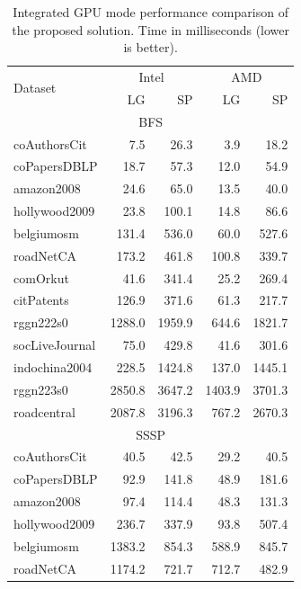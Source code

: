 \begin{table}[tbp]
\caption{Integrated GPU mode performance comparison of the proposed solution. Time in milliseconds (lower is better).} 
\begin{center}
    \begin{tabular}{|l|r|r|r|r|}
    \hline
    \multirow{2}{*}{Dataset} & \multicolumn{2}{c|}{Intel} & \multicolumn{2}{c|}{AMD} \\
    \cline{2-5}
    & LG & SP & LG & SP \\
    \hline
    \hline
    \multicolumn{5}{|c|}{BFS} \\
    \hline
    \rowcolor{black!10} coAuthorsCit&7.5&26.3&3.9&18.2\\
    \rowcolor{black!2 } coPapersDBLP&18.7&57.3&12.0&54.9\\
    \rowcolor{black!10} amazon2008&24.6&65.0&13.5&40.0\\
    \rowcolor{black!2 } hollywood2009&23.8&100.1&14.8&86.6\\
    \rowcolor{black!10} belgiumosm&131.4&536.0&60.0&527.6\\
    \rowcolor{black!2 } roadNetCA&173.2&461.8&100.8&339.7\\
    \rowcolor{black!10} comOrkut&41.6&341.4&25.2&269.4\\
    \rowcolor{black!2 } citPatents&126.9&371.6&61.3&217.7\\
    \rowcolor{black!10} rggn222s0&1288.0&1959.9&644.6&1821.7\\
    \rowcolor{black!2 } socLiveJournal&75.0&429.8&41.6&301.6\\
    \rowcolor{black!10} indochina2004&228.5&1424.8&137.0&1445.1\\
    \rowcolor{black!2 } rggn223s0&2850.8&3647.2&1403.9&3701.3\\
    \rowcolor{black!10} roadcentral&2087.8&3196.3&767.2&2670.3\\
    \hline
    \hline
    \multicolumn{5}{|c|}{SSSP} \\
    \hline
    \rowcolor{black!10} coAuthorsCit&40.5&42.5&29.2&40.5\\
    \rowcolor{black!2 } coPapersDBLP&92.9&141.8&48.9&181.6\\
    \rowcolor{black!10} amazon2008&97.4&114.4&48.3&131.3\\
    \rowcolor{black!2 } hollywood2009&236.7&337.9&93.8&507.4\\
    \rowcolor{black!10} belgiumosm&1383.2&854.3&588.9&845.7\\
    \rowcolor{black!2 } roadNetCA&1174.2&721.7&712.7&482.9\\

\end{tabular}
\end{center}
\end{table}
